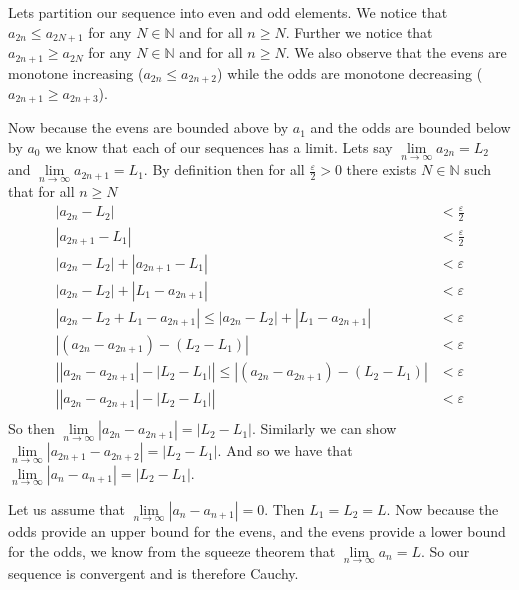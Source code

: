 \documentclass[letterpaper]{article}
\begin{document}
\begin{enumerate}
\begin{enumerate}
  Lets partition our sequence into even and odd elements.
  We notice that $a_{2n}\le a_{2N+1}$ for any $N\in \mathbb{N}$ and for all $n\ge N$.
  Further we notice that $a_{2n+1}\ge a_{2N}$ for any $N\in\mathbb{N}$ and for all $n\ge N$.
  We also observe that the evens are monotone increasing ($a_{2n}\le a_{2n+2}$) while the odds are monotone decreasing ($a_{2n+1}\ge a_{2n+3}$).

  Now because the evens are bounded above by $a_{1}$ and the odds are bounded below by $a_0$ we know that each of our sequences has a limit.
  Lets say $\lim\limits_{n\to\infty}a_{2n}=L_2$ and $\lim\limits_{n\to\infty}a_{2n+1}=L_1$.
  By definition then for all $\frac{\varepsilon}{2}>0$ there exists $N\in \mathbb{N}$ such that for all $n\ge N$
  \begin{align*}
    \left\lvert a_{2n}-L_2\right\rvert&<\frac{\varepsilon}{2}\\
    \left\lvert a_{2n+1}-L_1\right\rvert&<\frac{\varepsilon}{2}\\
    \left\lvert a_{2n}-L_2\right\rvert+\left\lvert a_{2n+1}-L_1\right\rvert&<\varepsilon\\
    \left\lvert a_{2n}-L_2\right\rvert+\left\lvert L_1-a_{2n+1}\right\rvert&<\varepsilon\\
    \left\lvert a_{2n}-L_2+L_1-a_{2n+1}\right\rvert\le\left\lvert a_{2n}-L_2\right\rvert+\left\lvert L_1-a_{2n+1}\right\rvert&<\varepsilon\\
    \left\lvert (a_{2n}-a_{2n+1})-(L_2-L_1)\right\rvert&<\varepsilon\\
    \left\lvert \left\lvert a_{2n}-a_{2n+1}\right\rvert -\left\lvert L_2-L_1\right\rvert \right\rvert\le\left\lvert (a_{2n}-a_{2n+1})-(L_2-L_1)\right\rvert&<\varepsilon\\
    \left\lvert \left\lvert a_{2n}-a_{2n+1}\right\rvert -\left\lvert L_2-L_1\right\rvert \right\rvert&<\varepsilon\\
  \end{align*}
  So then $\lim\limits_{n\to\infty}\left\lvert a_{2n}-a_{2n+1}\right\rvert=\left\lvert L_2-L_1\right\rvert$.
  Similarly we can show $\lim\limits_{n\to\infty}\left\lvert a_{2n+1}-a_{2n+2}\right\rvert=\left\lvert L_2-L_1\right\rvert$.
  And so we have that $\lim\limits_{n\to\infty}\left\lvert a_n-a_{n+1}\right\rvert=\left\lvert L_2-L_1\right\rvert$.

  Let us assume that $\lim\limits_{n\to\infty}\left\lvert a_n-a_{n+1}\right\rvert=0$. Then $L_1=L_2=L$. Now because the odds provide an upper bound for the evens, and the evens provide a lower bound for the odds, we know from the squeeze theorem that $\lim\limits_{n\to\infty}a_n=L$. So our sequence is convergent and is therefore Cauchy.


\end{enumerate}
\end{enumerate}
\end{document}
